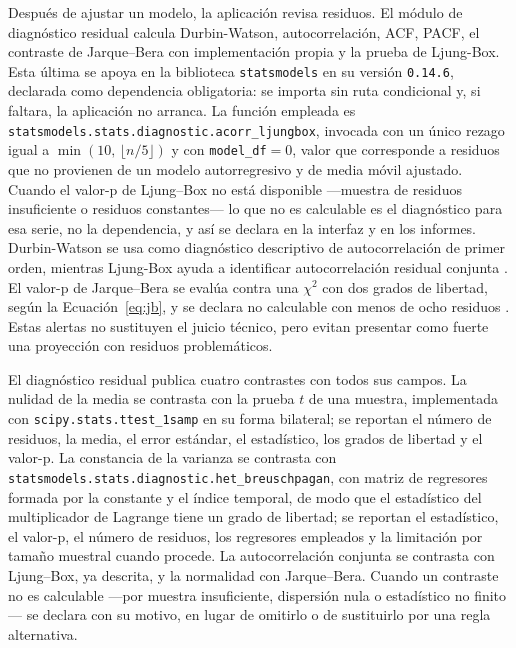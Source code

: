 \documentclass[12pt,letterpaper]{article}
\providecommand{\parencite}{\citep}
\begin{document}
Después de ajustar un modelo, la aplicación revisa residuos. El módulo de diagnóstico residual calcula Durbin-Watson, autocorrelación, ACF, PACF, el contraste de Jarque--Bera con implementación propia y la prueba de Ljung-Box. Esta última se apoya en la biblioteca \texttt{statsmodels} en su versión \texttt{0.14.6}, declarada como dependencia obligatoria: se importa sin ruta condicional y, si faltara, la aplicación no arranca. La función empleada es \texttt{statsmodels.stats.diagnostic.acorr\_ljungbox}, invocada con un único rezago igual a $\min(10,\,\lfloor n/5 \rfloor)$ y con \texttt{model\_df}$=0$, valor que corresponde a residuos que no provienen de un modelo autorregresivo y de media móvil ajustado. Cuando el valor-p de Ljung--Box no está disponible ---muestra de residuos insuficiente o residuos constantes--- lo que no es calculable es el diagnóstico para esa serie, no la dependencia, y así se declara en la interfaz y en los informes. Durbin-Watson se usa como diagnóstico descriptivo de autocorrelación de primer orden, mientras Ljung-Box ayuda a identificar autocorrelación residual conjunta \parencite{statsmodels_durbin_watson,statsmodels_ljungbox}. El valor-p de Jarque--Bera se evalúa contra una $\chi^2$ con dos grados de libertad, según la Ecuación~\ref{eq:jb}, y se declara no calculable con menos de ocho residuos \parencite{jarque_bera1987}. Estas alertas no sustituyen el juicio técnico, pero evitan presentar como fuerte una proyección con residuos problemáticos.

El diagnóstico residual publica cuatro contrastes con todos sus campos. La nulidad de la media se contrasta con la prueba \(t\) de una muestra, implementada con \texttt{scipy.stats.ttest\_1samp} en su forma bilateral; se reportan el número de residuos, la media, el error estándar, el estadístico, los grados de libertad y el valor-p. La constancia de la varianza se contrasta con \texttt{statsmodels.stats.diagnostic.het\_breuschpagan}, con matriz de regresores formada por la constante y el índice temporal, de modo que el estadístico del multiplicador de Lagrange tiene un grado de libertad; se reportan el estadístico, el valor-p, el número de residuos, los regresores empleados y la limitación por tamaño muestral cuando procede. La autocorrelación conjunta se contrasta con Ljung--Box, ya descrita, y la normalidad con Jarque--Bera. Cuando un contraste no es calculable ---por muestra insuficiente, dispersión nula o estadístico no finito--- se declara con su motivo, en lugar de omitirlo o de sustituirlo por una regla alternativa.
\end{document}
